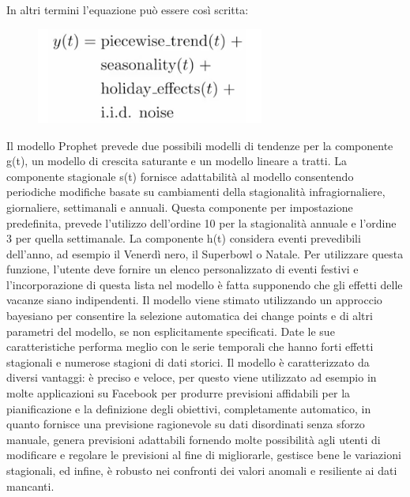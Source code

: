 \documentclass[12pt, a4paper, twocolumn]{article} %
\begin{document}
In altri termini l’equazione può essere così scritta:
\begin{figure}
  \caption{}
  \begin{center}
    \includegraphics[width=75mm,scale=0.5]{prophet.png}
  \end{center}
\end{figure}

Il modello Prophet prevede due possibili modelli di tendenze per la componente g(t), un modello di crescita saturante e un modello lineare a tratti. La componente stagionale s(t) fornisce adattabilità al modello consentendo periodiche modifiche basate su cambiamenti della stagionalità infragiornaliere, giornaliere, settimanali e annuali. Questa componente per impostazione predefinita, prevede l'utilizzo dell’ordine 10 per la stagionalità annuale e l'ordine 3 per quella settimanale. La componente h(t) considera eventi prevedibili dell'anno, ad esempio  il Venerdì nero, il Superbowl o Natale. Per utilizzare questa funzione, l'utente deve fornire un elenco personalizzato di eventi festivi e l’incorporazione di questa lista nel modello è fatta supponendo che gli effetti delle vacanze siano indipendenti. Il modello viene stimato utilizzando un approccio bayesiano per consentire la selezione automatica dei change points e di altri parametri del modello, se non esplicitamente specificati. Date le sue caratteristiche performa meglio con le serie temporali che hanno forti effetti stagionali e numerose stagioni di dati storici. Il modello è caratterizzato da diversi vantaggi: è preciso e veloce, per questo viene utilizzato ad esempio in molte applicazioni su Facebook per produrre previsioni affidabili per la pianificazione e la definizione degli obiettivi, completamente automatico, in quanto fornisce una previsione ragionevole su dati disordinati senza sforzo manuale, genera previsioni adattabili fornendo molte possibilità agli utenti di modificare e regolare le previsioni al fine di migliorarle, gestisce bene le variazioni stagionali, ed infine, è robusto nei confronti dei valori anomali e resiliente ai dati mancanti.\\
\end{document}
